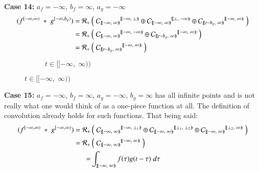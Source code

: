 \textbf{Case 14:} $a_f=-\infty$, $b_f=\infty$, $a_g =-\infty$
\begin{align*}
	(f^{[-\infty,\infty)} \;*\; g^{[-\infty,b_g)})
	= \R[+] &\left( \; 
			{\C[ [\![-\infty,\;\infty)\!) ]}^{[\![-\infty,\; \bot)\!)} \oplus
			{\C[ [\![-\infty,\;\infty)\!) ]}^{[\![\bot,\; -\infty)\!)} \oplus
			{\C[ [\![t-b_g,\;\infty)\!) ]}^{[\![-\infty,\; \infty)\!)} 
		\; \right) \\
	= \R[+] &\left( \; 
			{\C[ [\![-\infty,\;\infty)\!) ]}^{[\![-\infty,\; -\infty)\!)} \oplus
			{\C[ [\![t-b_g,\;\infty)\!) ]}^{[\![-\infty,\; \infty)\!)} 
		\; \right) \\
	= \R[+] &\left( \; 
			{\C[ [\![t-b_g,\;\infty)\!) ]}^{[\![-\infty,\; \infty)\!)} 
		\; \right) 
\end{align*}
\vspace{-1.5cm}
\begin{figure}[h]
	\centering
	\begin{subfigure}[h]{0.4\textwidth}
		\caption{$t \in [\![-\infty, \; \infty)\!)$} 
		\centering
	\end{subfigure}
\end{figure}


\textbf{Case 15:} $a_f=-\infty$, $b_f=\infty$, $a_g =-\infty$, $b_g=\infty$
has all infinite points and is not really what one would think of as a one-piece function at all.
The definition of convolution already holds for such functions.
That being said:
\begin{align*}
	(f^{[-\infty,\infty)} \;*\; g^{[-\infty,\infty)})
	= \R[+] &\left( \; 
			{\C[ [\![-\infty,\;\infty)\!) ]}^{[\![-\infty,\; \bot_1)\!)} \oplus
			{\C[ [\![-\infty,\;\infty)\!) ]}^{[\![\bot_1,\;\bot_2)\!)} \oplus
			{\C[ [\![-\infty,\;\infty)\!) ]}^{[\![\bot_2,\; \infty)\!)} 
		\; \right) \\
	= \R[+] &\left( \; 
			{\C[ [\![-\infty,\;\infty)\!) ]}^{[\![-\infty,\; \infty)\!)} 
		\; \right) \\
	= & \int_{[\![ -\infty, \; \infty )\!)} f(\tau)g(t-\tau) \; d\tau
\end{align*}



